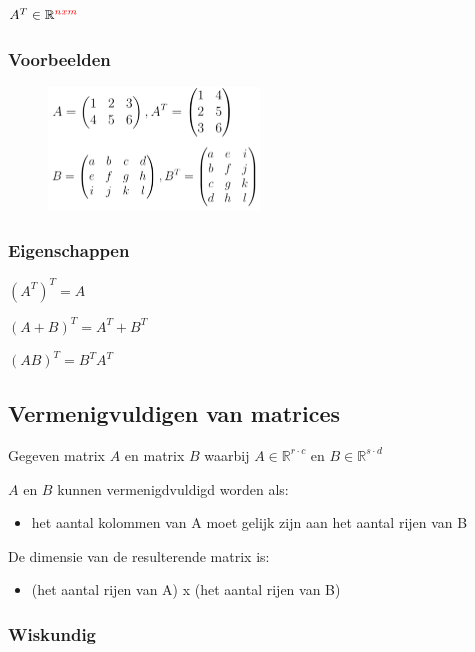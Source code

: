 \documentclass{article}
\begin{document}
$A^T \in \mathbb{R}^{\textcolor{red}{nxm}}$

\subsubsection{Voorbeelden}

\begin{figure}[H]
    \centering
    \includegraphics[width=0.5\textwidth]{matrix-getransponeerd-voorbeelden.png}
\end{figure}


\subsubsection{Eigenschappen}

$(A^T)^T = A$

$(A + B)^T = A^T + B^T$

$(AB)^T = B^T A^T$

\subsection{Vermenigvuldigen van matrices}

Gegeven matrix $A$ en matrix $B$ waarbij $A \in \mathbb{R}^{r\cdot c}$ en $B \in \mathbb{R}^{s \cdot d}$

$A$ en $B$ kunnen vermenigdvuldigd worden als:

\begin{itemize}
    \item het aantal kolommen van A moet gelijk zijn aan het aantal rijen van B
\end{itemize}

De dimensie van de resulterende matrix is:

\begin{itemize}
    \item (het aantal rijen van A) x (het aantal rijen van B)
\end{itemize}

\subsubsection{Wiskundig}
\end{document}
